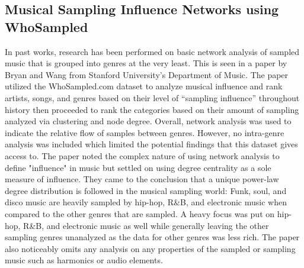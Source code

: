\documentclass[pageno]{jpaper}
\begin{document}
\subsection{Musical Sampling Influence Networks using WhoSampled}
In past works, research has been performed on basic network analysis of sampled music that is grouped into genres at the very least. This is seen in
a paper by Bryan and Wang from Stanford University’s Department of Music. The paper utilized the WhoSampled.com dataset to analyze musical influence and rank artists, songs, and genres based on their level of “sampling influence” throughout history then proceeded to rank the categories based on their amount of sampling analyzed via clustering and node degree. Overall, network analysis was used to indicate the relative flow of samples between genres. However, no intra-genre analysis was included which limited the potential findings that this dataset gives access to. The paper noted the complex nature of using network analysis to define "influence" in music but settled on using degree centrality as a sole measure of influence. They came to the conclusion that a unique power-law degree distribution is followed in the musical sampling world: Funk, soul, and disco music are heavily sampled by hip-hop, R\&B, and electronic music when compared to the other genres that are sampled. A heavy focus was put on hip-hop, R\&B, and electronic music as well while generally leaving the other sampling genres unanalyzed as the data for other genres was less rich. The paper also noticeably omits any analysis on any properties of the sampled or sampling music such as harmonics or audio elements. \cite{Bryan}
\end{document}
